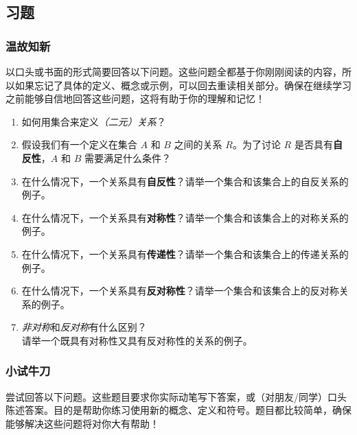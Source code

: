 
\subsection{习题}\label{sec:section6.2.5}

\subsubsection*{温故知新}

以口头或书面的形式简要回答以下问题。这些问题全都基于你刚刚阅读的内容，所以如果忘记了具体的定义、概念或示例，可以回去重读相关部分。确保在继续学习之前能够自信地回答这些问题，这将有助于你的理解和记忆！

\begin{enumerate}[label=(\arabic*)]
    \item 如何用集合来定义\emph{（二元）关系}？
    \item 假设我们有一个定义在集合 $A$ 和 $B$ 之间的关系 $R$。为了讨论 $R$ 是否具有\textbf{自反性}，$A$ 和 $B$ 需要满足什么条件？
    \item 在什么情况下，一个关系具有\textbf{自反性}？请举一个集合和该集合上的自反关系的例子。
    \item 在什么情况下，一个关系具有\textbf{对称性}？请举一个集合和该集合上的对称关系的例子。
    \item 在什么情况下，一个关系具有\textbf{传递性}？请举一个集合和该集合上的传递关系的例子。
    \item 在什么情况下，一个关系具有\textbf{反对称性}？请举一个集合和该集合上的反对称关系的例子。
    \item \emph{非对称}和\emph{反对称}有什么区别？\\
        请举一个既具有对称性又具有反对称性的关系的例子。
\end{enumerate}

\subsubsection*{小试牛刀}

尝试回答以下问题。这些题目要求你实际动笔写下答案，或（对朋友/同学）口头陈述答案。目的是帮助你练习使用新的概念、定义和符号。题目都比较简单，确保能够解决这些问题将对你大有帮助！

